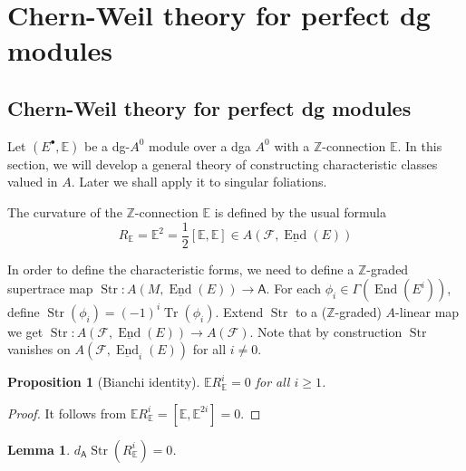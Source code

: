 \documentclass[12pt]{amsart}
\newtheorem{lem}[thm]{Lemma}
\newtheorem{prop}[thm]{Proposition}
\theoremstyle{definition}
\theoremstyle{remark}
\numberwithin{equation}{section}
\newcommand{\CF}{{\mathcal F}}
\newcommand{\Z}{{\mathbb{Z}}}
\newcommand{\1}{{\mathbb{1}}}
\newcommand{\End}{\operatorname{End}}
\newcommand{\tr}{\operatorname{Tr}}
\newcommand{\str}{\operatorname{Str}}
\begin{document}
\section{Chern-Weil theory for perfect dg modules}

\subsection{Chern-Weil theory for perfect dg modules}
Let $(E^{\bullet}, \mathbb{E})$ be a dg-$A^0$ module over a dga $A^0$ with a $\Z$-connection $\mathbb{E}$. In this section, we will develop a general theory of constructing characteristic classes valued in $A$. Later we shall apply it to singular foliations.

The curvature of the $\Z$-connection $\mathbb{E}$ is defined by the usual formula 
\begin{equation*}
    R_{\mathbb{E}} = \mathbb{E}^2 = \frac{1}{2}[\mathbb{E}, \mathbb{E}] \in A(\CF, \underline{\End}(E))
\end{equation*}

In order to define the characteristic forms, we need to define a $\Z$-graded supertrace map $\str: A(M, \underline{\End}(E)) \to \mathsf{A}$. For each 
$\phi_i \in \Gamma(\End(E^i))$, define $\str(\phi_i) = (-1)^i \tr(\phi_i)$. Extend $\str$ to a ($\Z$-graded) $A$-linear map we get  $\str:  A(\CF, \underline{\End}(E)) \to A(\CF)$. Note that by construction $\str$ vanishes on $A(\CF, \underline{\End}_i(E))$ for all $i \not= 0$. 

\begin{prop}[Bianchi identity]
$\mathbb{E}R_{\mathbb{E}}^{i} = 0$ for all $i \ge 1$.
\end{prop}
\begin{proof}
It follows from $\mathbb{E}R_{\mathbb{E}}^{i} = [\mathbb{E}, \mathbb{E}^{2i}] = 0$.
\end{proof}

\begin{lem}
$d_{\mathsf{A}}\str(R_{\mathbb{E}}^{i}) = 0$.
\end{lem}
\end{document}
